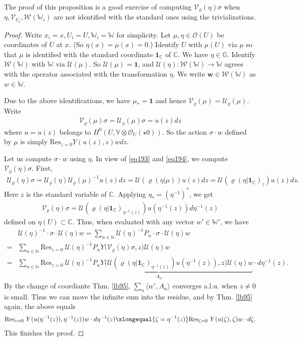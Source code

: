 \documentclass[11pt,b5paper,notitlepage]{article}
\theoremstyle{definition}
\theoremstyle{plain}
\newcommand{\mc}{\mathcal}
\newcommand{\id}{\mathbf{1}}
\newcommand{\Res}{\mathrm{Res}}
\newcommand{\bk}[1]{\langle {#1}\rangle}
\newcommand{\scr}{\mathscr}
\newcommand{\Vbb}{\mathbb V}
\newcommand{\Wbb}{\mathbb W}
\newcommand{\Gbb}{\mathbb G}
\newcommand{\Cbb}{\mathbb C}
\newcommand{\Nbb}{\mathbb N}
\newcommand{\wbf}{\mathbf w}
\numberwithin{equation}{section}
\begin{document}
The proof of this proposition is a good exercise of computing $\mc V_\varrho(\eta)\sigma$ when $\eta,\scr V_{U_i},\scr W(\Wbb_i)$ are not identified with the standard ones using the trivializations.

\begin{proof}
Write $x_i=x,U_i=U,\Wbb_i=\Wbb$ for simplicity. Let $\mu,\eta\in\scr O(U)$ be coordinates of $U$ at $x$. (So $\eta(x)=\mu(x)=0$.) Identify $U$ with $\mu(U)$ via $\mu$ so that $\mu$ is identified with the standard coordinate $\id_\Cbb$ of $\Cbb$. We have $\eta\in\Gbb$. Identify $\scr W(\Wbb)$ with $\Wbb$ via $\mc U(\mu)$. So $\mc U(\mu)=\id$, and $\mc U(\eta):\scr W(\Wbb)\rightarrow\Wbb$ agrees with the operator associated with the transformation $\eta$. We  write $\wbf\in\scr W(\Wbb)$ as $w\in\Wbb$.

Due to the above identifications, we have $\mu_*=\id$ and hence $\mc V_\varrho(\mu)=\mc U_\varrho(\mu)$. Write
\begin{align*}
\mc V_\varrho(\mu)\sigma=\mc U_\varrho(\mu)\sigma=u(z)dz
\end{align*}
where $u=u(z)$ belongs to $H^0(U,\Vbb\otimes\scr O_U(\star 0))$. So the action $\sigma\cdot w$ defined by $\mu$ is simply $\Res_{z=0}Y(u(z),z)wdz$.

Let us compute $\sigma\cdot w$ using $\eta$. In view of \eqref{eq193} and \eqref{eq194}, we compute $\mc V_\varrho(\eta)\sigma$. First,
\begin{align*}
\mc U_\varrho(\eta)\sigma=\mc U_\varrho(\eta)\mc U_\varrho(\mu)^{-1}u(z)dz=\mc U(\varrho(\eta|\mu))u(z)dz=\mc U(\varrho(\eta|\id_\Cbb)_z)u(z)dz.
\end{align*}
Here $z$ is the standard variable of $\Cbb$. Applying $\eta_*=(\eta^{-1})^*$, we get
\begin{align*}
\mc V_\varrho(\eta)\sigma=\mc U(\varrho(\eta|\id_\Cbb)_{\eta^{-1}(z)})u(\eta^{-1}(z))d{\eta^{-1}(z)}
\end{align*}
defined on $\eta(U)\subset\Cbb$. Thus, when evaluated with any vector  $w'\in\Wbb'$, we have
\begin{align*}
&\mc U(\eta)^{-1}\cdot \sigma\cdot \mc U(\eta)w=\sum_{n\in\Nbb}\mc U(\eta)^{-1}P_n\cdot \sigma\cdot \mc U(\eta)w\\
=&\sum_{n\in\Nbb}\Res_{z=0}~\mc U(\eta)^{-1}P_n Y\big(\mc V_\varrho(\eta)\sigma,z\big)\mc U(\eta) w\\
=&\sum_{n\in\Nbb}\Res_{z=0}~\underbrace {\mc U(\eta)^{-1}P_n Y\big(\mc U(\varrho(\eta|\id_\Cbb)_{\eta^{-1}(z)})u(\eta^{-1}(z)),z\big)\mc U(\eta) w}_{A_n}\cdot d{\eta^{-1}(z)}.
\end{align*}
By the change of coordiante Thm. \ref{lb95}, $\sum_n\bk{w',A_n}$ converges a.l.u. when $z\neq 0$ is small. Thus we can move the infinite sum into the residue, and by Thm. \ref{lb95} again, the above equals
\begin{align*}
\Res_{z=0}~Y(u(\eta^{-1}(z)),\eta^{-1}(z))w\cdot d\eta^{-1}(z)
\xlongequal{\zeta=\eta^{-1}(z)}\Res_{\zeta=0}~Y(u(\zeta),\zeta)w\cdot d\zeta.
\end{align*}
This finishes the proof.
\end{proof}
\end{document}
